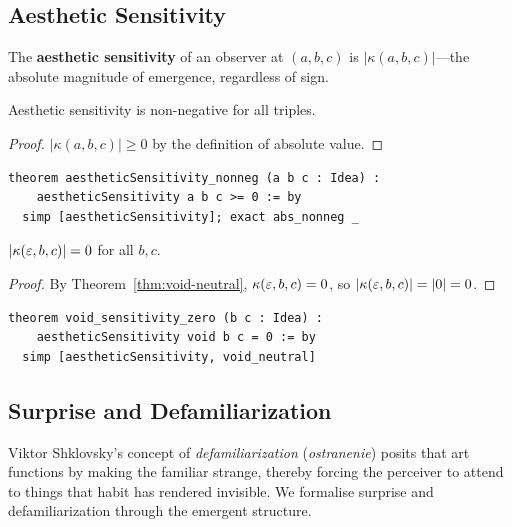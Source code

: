 \subsection{Aesthetic Sensitivity}

\begin{definition}
\label{def:aesthetic-sensitivity}
The \textbf{aesthetic sensitivity} of an observer at $(a, b, c)$ is
$|\kappa(a, b, c)|$---the absolute magnitude of emergence, regardless
of sign.
\end{definition}

\begin{theorem}
\label{thm:sensitivity-nonneg}
Aesthetic sensitivity is non-negative for all triples.
\end{theorem}

\begin{proof}
$|\kappa(a, b, c)| \geq 0$ by the definition of absolute value.
\end{proof}

\begin{lstlisting}
theorem aestheticSensitivity_nonneg (a b c : Idea) :
    aestheticSensitivity a b c >= 0 := by
  simp [aestheticSensitivity]; exact abs_nonneg _
\end{lstlisting}

\begin{theorem}
\label{thm:void-sensitivity-zero}
$|\kappa(\varepsilon, b, c)| = 0$ for all $b, c$.
\end{theorem}

\begin{proof}
By Theorem~\ref{thm:void-neutral}, $\kappa(\varepsilon, b, c) = 0$, so
$|\kappa(\varepsilon, b, c)| = |0| = 0$.
\end{proof}

\begin{lstlisting}
theorem void_sensitivity_zero (b c : Idea) :
    aestheticSensitivity void b c = 0 := by
  simp [aestheticSensitivity, void_neutral]
\end{lstlisting}

\subsection{Surprise and Defamiliarization}

Viktor Shklovsky's concept of \emph{defamiliarization} (\emph{ostranenie})
posits that art functions by making the familiar strange, thereby forcing
the perceiver to attend to things that habit has rendered invisible.  We
formalise surprise and defamiliarization through the emergent structure.

